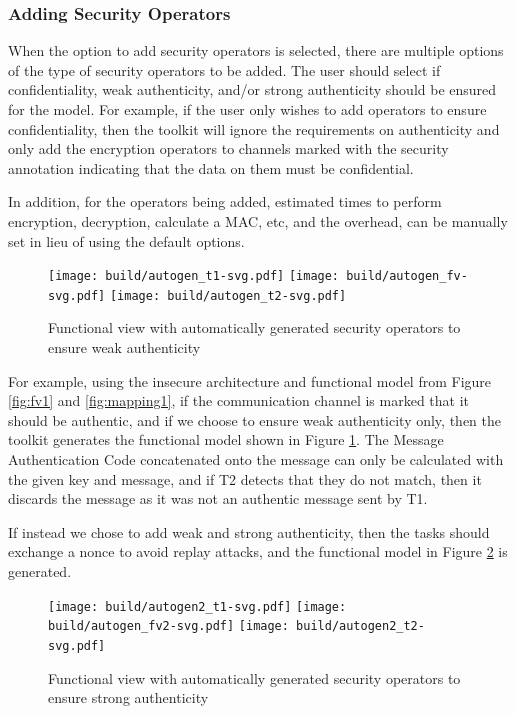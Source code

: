 \documentclass[12pt]{article}
\begin{document}
\subsubsection{Adding Security Operators}

When the option to add security operators is selected, there are multiple options of the type of security operators to be added. The user should select if confidentiality, weak authenticity, and/or strong authenticity should be ensured for the model. For example, if the user only wishes to add operators to ensure confidentiality, then the toolkit will ignore the requirements on authenticity and only add the encryption operators to channels marked with the security annotation indicating that the data on them must be confidential.

  In addition, for the operators being added, estimated times to perform encryption, decryption, calculate a MAC, etc, and the overhead, can be manually set in lieu of using the default options. 

\begin{figure}[htbp]
\centering
\texttt{[image: build/autogen\_t1-svg.pdf]}
\texttt{[image: build/autogen\_fv-svg.pdf]}
\texttt{[image: build/autogen\_t2-svg.pdf]}
\caption{Functional view with automatically generated security operators to ensure weak authenticity} \label{fig:secfv1}
\end{figure}
  
  For example, using the insecure architecture and functional model from Figure \ref{fig:fv1} and \ref{fig:mapping1}, if the communication channel is marked that it should be authentic, and if we choose to ensure weak authenticity only, then the toolkit generates the functional model shown in Figure \ref{fig:secfv1}. The Message Authentication Code concatenated onto the message can only be calculated with the given key and message, and if T2 detects that they do not match, then it discards the message as it was not an authentic message sent by T1.
  
  If instead we chose to add weak and strong authenticity, then the tasks should exchange a nonce to avoid replay attacks, and the functional model in Figure \ref{fig:secfv2} is generated. 

\begin{figure}[htbp]
\centering
\texttt{[image: build/autogen2\_t1-svg.pdf]}
\texttt{[image: build/autogen\_fv2-svg.pdf]}
\texttt{[image: build/autogen2\_t2-svg.pdf]}
\caption{Functional view with automatically generated security operators to ensure strong authenticity} \label{fig:secfv2}
\end{figure}
\end{document}
